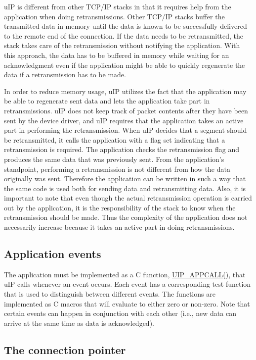 u\-IP is different from other TCP/IP stacks in that it requires help from the application when doing retransmissions. Other TCP/IP stacks buffer the transmitted data in memory until the data is known to be successfully delivered to the remote end of the connection. If the data needs to be retransmitted, the stack takes care of the retransmission without notifying the application. With this approach, the data has to be buffered in memory while waiting for an acknowledgment even if the application might be able to quickly regenerate the data if a retransmission has to be made.

In order to reduce memory usage, u\-IP utilizes the fact that the application may be able to regenerate sent data and lets the application take part in retransmissions. u\-IP does not keep track of packet contents after they have been sent by the device driver, and u\-IP requires that the application takes an active part in performing the retransmission. When u\-IP decides that a segment should be retransmitted, it calls the application with a flag set indicating that a retransmission is required. The application checks the retransmission flag and produces the same data that was previously sent. From the application's standpoint, performing a retransmission is not different from how the data originally was sent. Therefore the application can be written in such a way that the same code is used both for sending data and retransmitting data. Also, it is important to note that even though the actual retransmission operation is carried out by the application, it is the responsibility of the stack to know when the retransmission should be made. Thus the complexity of the application does not necessarily increase because it takes an active part in doing retransmissions.\hypertarget{main_appevents}{}\subsection{Application events}\label{main_appevents}
The application must be implemented as a C function, \hyperlink{a00078_g41aa744caa46913b3b3aedb2a4e78546}{UIP\_\-APPCALL()}, that u\-IP calls whenever an event occurs. Each event has a corresponding test function that is used to distinguish between different events. The functions are implemented as C macros that will evaluate to either zero or non-zero. Note that certain events can happen in conjunction with each other (i.e., new data can arrive at the same time as data is acknowledged).\hypertarget{main_connstate}{}\subsection{The connection pointer}\label{main_connstate}
